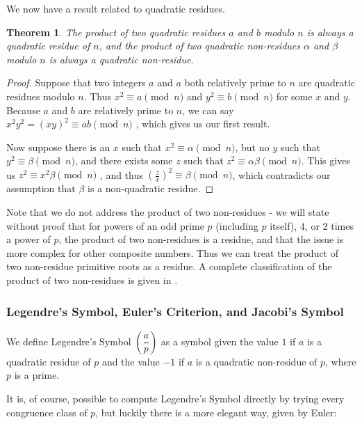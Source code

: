 \documentclass{article}
\newtheorem*{theorem}{Theorem}
\begin{document}
\par We now have a result related to quadratic residues.
 \begin{theorem}
 The product of two quadratic residues $a$ and $b$ modulo $n$ is always a quadratic residue of $n$, and the product of two quadratic non-residues $\alpha$ and $\beta$ modulo $n$ is always a quadratic non-residue.
 \end{theorem}
 \begin{proof}
 Suppose that two integers $a$ and $a$ both relatively prime to $n$ are quadratic residues modulo $n$. Thus $x^2 \equiv a
  \pmod n$ and $y^2 \equiv b \pmod n$ for some $x$ and $y$. Because $a$ and $b$ are relatively prime to $n$, we can say
   $x^2y^2 = (xy)^2 \equiv ab \pmod n$ , which gives us our first result.
 \par Now suppose there is an $x$ such that  $x^2 \equiv \alpha \pmod n$, but no $y$ such that  $y^2 \equiv \beta \pmod n$,
  and there exists some $z$ such that $z^2 \equiv \alpha\beta \pmod n$. This gives us $z^2 \equiv x^2 \beta \pmod n$ , and thus 
  $\left( \frac{z}{x} \right)^2 \equiv \beta \pmod n$, which contradicts our assumption that $\beta$ is a non-quadratic residue.
 \end{proof}
 
 \par Note that we do not address the product of two non-residues - we will state without proof that for powers of an odd prime $p$ (including $p$ itself), $4$, or $2$ times a power of $p$, the product of two non-residues is a residue, and that the issue is more complex for other composite numbers. Thus we can treat the product of two non-residue primitive roots as a residue. A complete classification of the product of two non-residues is given in \citep[Appendix 3]{riesel}.
 
 
\subsubsection*{Legendre's Symbol, Euler's Criterion, and Jacobi's Symbol}
We define Legendre's Symbol $\left( \dfrac{a}{p} \right)$ as a symbol given the value $1$ if $a$ is a quadratic residue of $p$ and the value $-1$ if $a$ is a quadratic non-residue of $p$, where $p$ is a prime.
\par It is, of course, possible to compute Legendre's Symbol directly by trying every congruence class of $p$, but luckily there is a more elegant way, given by Euler:
\end{document}
